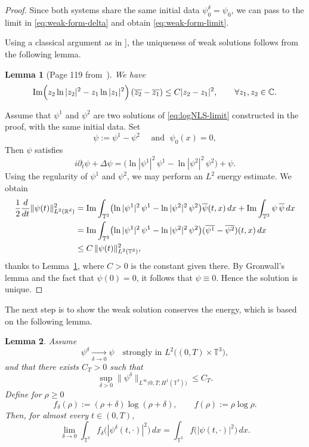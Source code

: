 \documentclass[11pt]{article}
\newtheorem{lemma}{Lemma}
\begin{document}
\begin{proof}
Since both systems share the same initial data $\psi^{\delta}_0=\psi_0$,   we can pass to the limit in \eqref{eq:weak-form-delta} and obtain \eqref{eq:weak-form-limit}.




Using a classical argument as in \cite{CarlesGallagher2018, Haraux1981}], the uniqueness of weak solutions follows from the following lemma.

\begin{lemma}[Page 119 from~\cite{Haraux1981}]\label{control of complex}
We have
\begin{equation}
\operatorname{Im}\Bigl( z_2 \ln |z_2|^2 - z_1 \ln |z_1|^2 \Bigr)\,(\overline{z_2}-\overline{z_1})
\leq C |z_2-z_1|^2,
\qquad \forall z_1,z_2 \in \mathbb{C}.
\end{equation}
\end{lemma}

Assume that $\psi^1$ and $\psi^2$ are two solutions of \eqref{eq:logNLS-limit} constructed in the proof, with the same initial data. Set
\[
\psi:=\psi^1-\psi^2 \quad\text{ and }\;\psi_0(x)=0,
\]
Then $\psi$ satisfies
\begin{equation}
i\partial_t\psi+\Delta\psi
=
\bigl(\ln|\psi^1|^2\,\psi^1-\ln|\psi^2|^2\,\psi^2\bigr)+\psi.
\end{equation}
Using the regularity of $\psi^1$ and $\psi^2$, we may perform an $L^2$ energy estimate. We obtain
\begin{align}
\frac12\frac{d}{dt}\|\psi(t)\|_{L^2(\mathbb{R}^d)}^2
&=
\operatorname{Im}\int_{\mathbb{T}^3}
\bigl(\ln|\psi^1|^2\,\psi^1-\ln|\psi^2|^2\,\psi^2\bigr)\overline{\psi}(t,x)\,dx
+\operatorname{Im}\int_{\mathbb{T}^3}\psi\,\overline{\psi}\,dx \notag\\
&=
\operatorname{Im}\int_{\mathbb{T}^3}
\bigl(\ln|\psi^1|^2\,\psi^1-\ln|\psi^2|^2\,\psi^2\bigr)
(\overline{\psi^1}-\overline{\psi^2})(t,x)\,dx \notag\\
&\leq C\,\|\psi(t)\|_{L^2(\mathbb{T}^3)}^2,
\end{align}
thanks to Lemma~\ref{control of complex}, where $C>0$ is the constant given there. By Gronwall's lemma and the fact that $\psi(0)=0$, it follows that $\psi\equiv 0$. Hence the solution is unique.


\end{proof}


The next step is to show the weak solution conserves the energy, which is based on the following lemma.


\begin{lemma}
\label{lemma:local-nonlinear-energy-convergence}
Assume
\[
\psi^{\delta}\xrightarrow[\delta\to 0]{}
\psi
\quad\text{strongly in }L^{2}\!\bigl((0,T)\times \mathbb{T}^3\bigr),
\]
and that there exists \(C_{T}>0\) such that
\[
\sup_{\delta>0}\|\psi^{\delta}\|_{L^{\infty}\!\bigl(0,T;H^{1}(\mathbb{T}^3)\bigr)}\le C_{T}.
\]
Define for \(\rho\ge 0\)
\[
f_{\delta}(\rho):=(\rho+\delta)\log(\rho+\delta),\qquad
f(\rho):=\rho\log\rho .
\]
Then, for almost every \(t\in(0,T)\),
\[
\lim_{\delta\to0}\int_{\mathbb{T}^3}
f_{\delta}\!\bigl(|\psi^{\delta}(t,\cdot)|^{2}\bigr)\,dx
=
\int_{\mathbb{T}^3}
f\!\bigl(|\psi(t,\cdot)|^{2}\bigr)\,dx .
\]
\end{lemma}
\end{document}
